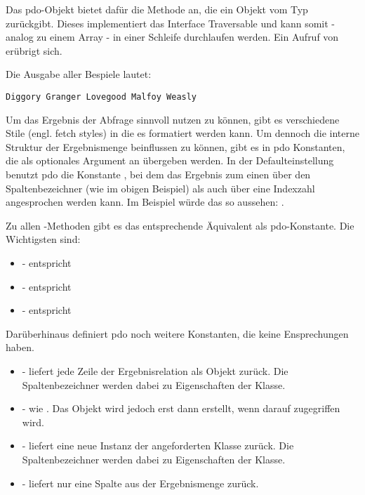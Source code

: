Das \gls{pdo}-Objekt bietet dafür die Methode  an, die ein Objekt vom Typ\\
 zurückgibt. Dieses implementiert das Interface Traversable und kann somit - analog zu einem Array - in einer Schleife durchlaufen werden. Ein Aufruf von\\
 erübrigt sich.


Die Ausgabe aller Bespiele lautet:
\begin{Verbatim}
Diggory Granger Lovegood Malfoy Weasly
\end{Verbatim}

Um das Ergebnis der Abfrage sinnvoll nutzen zu können, gibt es verschiedene Stile (engl. fetch styles) in die es formatiert werden kann. Um dennoch die interne Struktur der Ergebnismenge beinflussen zu können, gibt es in \gls{pdo} Konstanten, die als optionales Argument an  übergeben werden. In der Defaulteinstellung benutzt \gls{pdo} die Konstante , bei dem das Ergebnis zum einen über den Spaltenbezeichner (wie im obigen Beispiel) als auch über eine Indexzahl angesprochen werden kann. Im Beispiel würde das so aussehen: .

Zu allen -Methoden gibt es das entsprechende Äquivalent als \gls{pdo}-Konstante. Die Wichtigsten sind:

\begin{itemize}
	\item {} - entspricht 
	\item {} - entspricht 
	\item {} - entspricht 
\end{itemize}

Darüberhinaus definiert \gls{pdo} noch weitere Konstanten, die keine Ensprechungen haben.

\begin{itemize}
	\item {} - liefert jede Zeile der Ergebnisrelation als Objekt zurück. Die Spaltenbezeichner werden dabei zu Eigenschaften der Klasse.
	\item {} - wie . Das Objekt wird jedoch erst dann erstellt, wenn darauf zugegriffen wird.
	\item {} - liefert eine neue Instanz der angeforderten Klasse zurück. Die Spaltenbezeichner werden dabei zu Eigenschaften der Klasse.
	\item {} - liefert nur eine Spalte aus der Ergebnismenge zurück.
\end{itemize}

